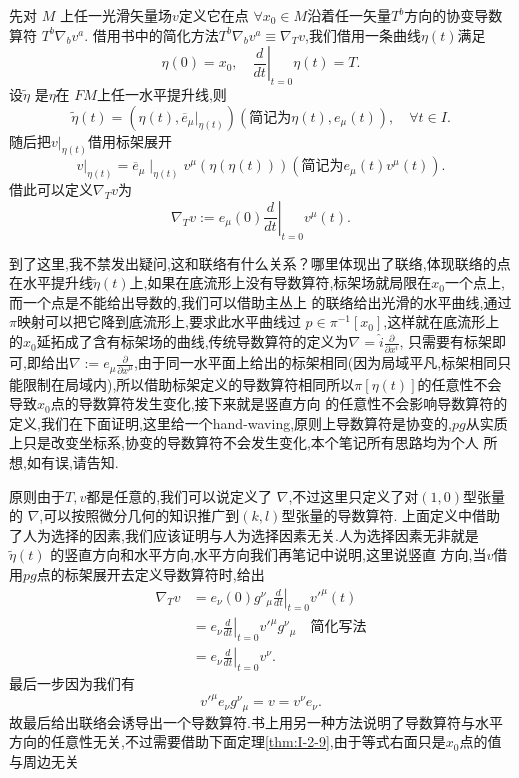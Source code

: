 \documentclass[../main.tex]{subfiles}
\begin{document}
先对 $M$ 上任一光滑矢量场$v$定义它在点 $\forall x_0 \in M$沿着任一矢量$T^b$方向的协变导数算符 $T^b\nabla _b v^a$.
借用书中的简化方法$T^b\nabla_b v^a \equiv \nabla_T v$,我们借用一条曲线$\eta(t)$满足 \[
  \eta(0) = x_0, \quad \left. \frac{d}{dt} \right|_{t = 0}\eta(t) = T
.\]
设$\tilde{\eta}$ 是$\eta$在 $FM$上任一水平提升线,则 \[
\tilde{\eta}(t) = (\eta(t),\overline{e}_\mu|_{\eta(t)}) (\text{简记为}\eta(t),e_\mu(t)), \quad \forall t \in I 
.\] 
随后把$v|_{\eta(t)}$借用标架展开 \[
  v|_{\eta(t)} = \overline{e}_\mu \mid_{\eta(t)}v^\mu(\eta(\eta(t))) (\text{简记为}e_\mu(t)v^\mu(t))
.\] 
借此可以定义$\nabla _T v$为\[
  \nabla_T v := e_\mu(0)\left. \frac{d}{dt} \right|_{t = 0}v^\mu(t)
.\] 
\begin{note}
  到了这里,我不禁发出疑问,这和联络有什么关系？哪里体现出了联络,体现联络的点在水平提升线$ \tilde{\eta}(t)$上,如果在底流形上没有导数算符,标架场就局限在$x_0$一个点上,而一个点是不能给出导数的,我们可以借助主丛上
  的联络给出光滑的水平曲线,通过$\pi$映射可以把它降到底流形上,要求此水平曲线过 $p\in \pi^{-1}[x_0]$,这样就在底流形上的$x_0$延拓成了含有标架场的曲线,传统导数算符的定义为$\nabla = \hat{i}\frac{\partial   }{\partial x^i}$,
  只需要有标架即可,即给出$\nabla := e_\mu \frac{\partial }{\partial x^\mu}$,由于同一水平面上给出的标架相同(因为局域平凡,标架相同只能限制在局域内),所以借助标架定义的导数算符相同所以$\pi[\eta(t)]$的任意性不会导致$x_0$点的导数算符发生变化,接下来就是竖直方向
  的任意性不会影响导数算符的定义,我们在下面证明,这里给一个hand-waving,原则上导数算符是协变的,$pg$从实质上只是改变坐标系,协变的导数算符不会发生变化,本个笔记所有思路均为个人
  所想,如有误,请告知.
\end{note}
原则由于$T,v$都是任意的,我们可以说定义了 $\nabla $,不过这里只定义了对$(1,0)$型张量的 $\nabla $,可以按照微分几何的知识推广到$(k,l)$型张量的导数算符.
上面定义中借助了人为选择的因素,我们应该证明与人为选择因素无关.人为选择因素无非就是$\tilde{\eta}(t)$ 的竖直方向和水平方向,水平方向我们再笔记中说明,这里说竖直
方向,当$v$借用$pg$点的标架展开去定义导数算符时,给出
\begin{align*}
  \nabla_T v &= e_\nu(0) g^{\nu}{}_{\mu}\left. \frac{d}{dt} \right|_{t = 0}v'^\mu(t) \\&=e_\nu\left. \frac{d}{dt} \right|_{t = 0}v'^\mu g^{\nu}{}_{\mu} \quad \text{简化写法}\\
             & =e_\nu \left. \frac{d}{dt} \right|_{t = 0} v^\nu
    .\end{align*}
最后一步因为我们有\[
v'^\mu e_\nu g^{\nu}{}_{\mu} = v = v^\nu e_\nu
.\] 
故最后给出联络会诱导出一个导数算符.书上用另一种方法说明了导数算符与水平方向的任意性无关,不过需要借助下面定理\ref{thm:I-2-9},由于等式右面只是$x_0$点的值与周边无关
\end{document}
